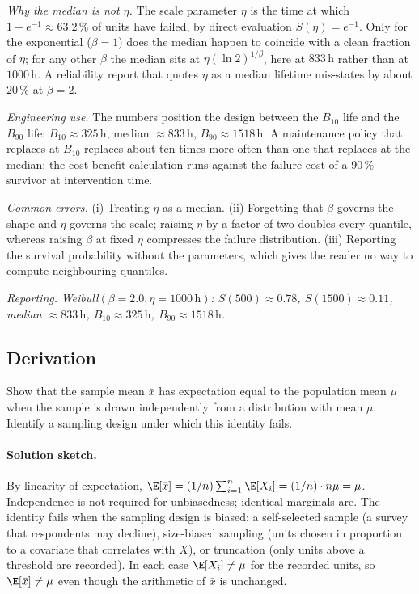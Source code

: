 \textit{Why the median is not $\eta$.} The scale parameter
$\eta$ is the time at which $1 - e^{-1} \approx 63.2 \,\%$ of units
have failed, by direct evaluation $S(\eta) = e^{-1}$. Only for the
exponential ($\beta = 1$) does the median happen to coincide with
a clean fraction of $\eta$; for any other $\beta$ the median sits
at $\eta(\ln 2)^{1/\beta}$, here at $833 \,\text{h}$ rather than at
$1000 \,\text{h}$. A reliability report that quotes $\eta$ as a
median lifetime mis-states by about $20 \,\%$ at $\beta = 2$.

\textit{Engineering use.} The numbers position the design between
the $B_{10}$ life and the $B_{90}$ life: $B_{10} \approx 325
\,\text{h}$, median $\approx 833 \,\text{h}$, $B_{90} \approx 1518
\,\text{h}$. A maintenance policy that replaces at $B_{10}$
replaces about ten times more often than one that replaces at the
median; the cost-benefit calculation runs against the failure cost
of a $90 \,\%$-survivor at intervention time.

\textit{Common errors.} (i) Treating $\eta$ as a median.
(ii) Forgetting that $\beta$ governs the shape and $\eta$ governs
the scale; raising $\eta$ by a factor of two doubles every quantile,
whereas raising $\beta$ at fixed $\eta$ compresses the failure
distribution. (iii) Reporting the survival probability without the
parameters, which gives the reader no way to compute neighbouring
quantiles.

\textit{Reporting.} \emph{Weibull$(\beta = 2.0, \eta = 1000
\,\text{h})$: $S(500) \approx 0.78$, $S(1500) \approx 0.11$, median
$\approx 833 \,\text{h}$, $B_{10} \approx 325 \,\text{h}$,
$B_{90} \approx 1518 \,\text{h}$.}

\subsection*{Derivation}

\begin{exercise}
Show that the sample mean $\bar{x}$ has expectation equal to the
population mean $\mu$ when the sample is drawn independently from a
distribution with mean $\mu$. Identify a sampling design under which
this identity fails.
\end{exercise}

\paragraph{Solution sketch.}
By linearity of expectation, $\E[\bar{x}] = (1/n) \sum_{i=1}^{n}
\E[X_{i}] = (1/n) \cdot n\mu = \mu$. Independence is not required
for unbiasedness; identical marginals are. The identity fails when
the sampling design is biased: a self-selected sample (a survey
that respondents may decline), size-biased sampling (units chosen
in proportion to a covariate that correlates with $X$), or
truncation (only units above a threshold are recorded). In each
case $\E[X_{i}] \neq \mu$ for the recorded units, so $\E[\bar{x}]
\neq \mu$ even though the arithmetic of $\bar{x}$ is unchanged.

